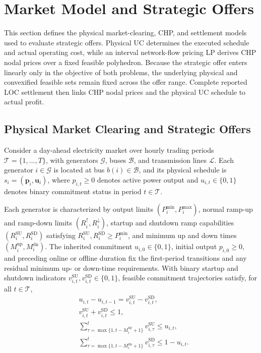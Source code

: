 \documentclass[journal]{IEEEtran}
\newcommand{\bp}{\bm p}
\newcommand{\bu}{\bm u}
\newcommand{\Pmin}{P^{\min}}
\newcommand{\Pmax}{P^{\max}}
\newcommand{\Rup}{R^{\uparrow}}
\newcommand{\Rdn}{R^{\downarrow}}
\newcommand{\Mup}{M^{\mathrm{up}}}
\newcommand{\Mdn}{M^{\mathrm{dn}}}
\begin{document}
\section{Market Model and Strategic Offers}
\label{sec:model}
This section defines the physical market-clearing, CHP, and settlement models used to evaluate strategic offers. Physical UC determines the executed schedule and actual operating cost, while an interval network-flow pricing LP derives CHP nodal prices over a fixed feasible polyhedron. Because the strategic offer enters linearly only in the objective of both problems, the underlying physical and convexified feasible sets remain fixed across the offer range. Complete reported LOC settlement then links CHP nodal prices and the physical UC schedule to actual profit.

\subsection{Physical Market Clearing and Strategic Offers}
Consider a day-ahead electricity market over hourly trading periods $\mathcal{T}=\{1,\ldots,T\}$, with generators $\mathcal{G}$, buses $\mathcal{B}$, and transmission lines $\mathcal{L}$. Each generator $i\in\mathcal{G}$ is located at bus $b(i)\in\mathcal{B}$, and its physical schedule is $s_i=(\bp_i,\bu_i)$, where $p_{i,t}\ge 0$ denotes active power output and $u_{i,t}\in\{0,1\}$ denotes binary commitment status in period $t\in\mathcal{T}$.

Each generator is characterized by output limits $(\Pmin_i,\Pmax_i)$, normal ramp-up and ramp-down limits $(\Rup_i,\Rdn_i)$, startup and shutdown ramp capabilities $(R_i^{\mathrm{SU}},R_i^{\mathrm{SD}})$ satisfying $R_i^{\mathrm{SU}},R_i^{\mathrm{SD}}\ge\Pmin_i$, and minimum up and down times $(\Mup_i,\Mdn_i)$. The inherited commitment $u_{i,0}\in\{0,1\}$, initial output $p_{i,0}\ge 0$, and preceding online or offline duration fix the first-period transitions and any residual minimum up- or down-time requirements. With binary startup and shutdown indicators $v_{i,t}^{\mathrm{SU}},v_{i,t}^{\mathrm{SD}}\in\{0,1\}$, feasible commitment trajectories satisfy, for all $t\in\mathcal{T}$,
\begin{subequations}\label{eq:commitment}
\begin{align}
 &u_{i,t}-u_{i,t-1} = v_{i,t}^{\mathrm{SU}}-v_{i,t}^{\mathrm{SD}},\\
 &v_{i,t}^{\mathrm{SU}}+v_{i,t}^{\mathrm{SD}} \le 1,\\
 &\sum\nolimits_{\tau=\max\{1,t-\Mup_i+1\}}^{t} v_{i,\tau}^{\mathrm{SU}} \le u_{i,t},\\
 &\sum\nolimits_{\tau=\max\{1,t-\Mdn_i+1\}}^{t} v_{i,\tau}^{\mathrm{SD}} \le 1-u_{i,t}.
\end{align}
\end{subequations}
\end{document}
